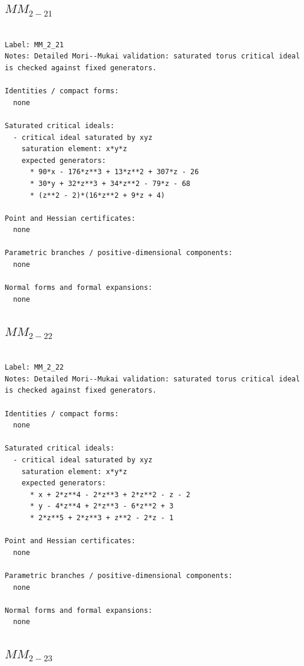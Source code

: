 \documentclass[10pt,a4paper]{article}
\begin{document}
\subsection*{$ MM_{2-21} $}

\begin{lstlisting}

Label: MM_2_21
Notes: Detailed Mori--Mukai validation: saturated torus critical ideal is checked against fixed generators.

Identities / compact forms:
  none

Saturated critical ideals:
  - critical ideal saturated by xyz
    saturation element: x*y*z
    expected generators:
      * 90*x - 176*z**3 + 13*z**2 + 307*z - 26
      * 30*y + 32*z**3 + 34*z**2 - 79*z - 68
      * (z**2 - 2)*(16*z**2 + 9*z + 4)

Point and Hessian certificates:
  none

Parametric branches / positive-dimensional components:
  none

Normal forms and formal expansions:
  none

\end{lstlisting}

\subsection*{$ MM_{2-22} $}

\begin{lstlisting}

Label: MM_2_22
Notes: Detailed Mori--Mukai validation: saturated torus critical ideal is checked against fixed generators.

Identities / compact forms:
  none

Saturated critical ideals:
  - critical ideal saturated by xyz
    saturation element: x*y*z
    expected generators:
      * x + 2*z**4 - 2*z**3 + 2*z**2 - z - 2
      * y - 4*z**4 + 2*z**3 - 6*z**2 + 3
      * 2*z**5 + 2*z**3 + z**2 - 2*z - 1

Point and Hessian certificates:
  none

Parametric branches / positive-dimensional components:
  none

Normal forms and formal expansions:
  none

\end{lstlisting}

\subsection*{$ MM_{2-23} $}
\end{document}
